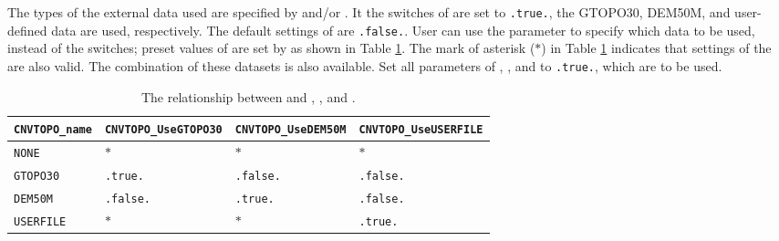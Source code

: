 The types of the external data used are specified by  and/or .
It the switches of  are set to \verb|.true.|, the GTOPO30, DEM50M, and user-defined data are used, respectively.
The default settings of  are \verb|.false.|.
User can use the parameter  to specify which data to be used, instead of the switches;
preset values of  are set by  as shown in Table \ref{tab:cvntopo_name}.
The mark of asterisk ($\ast$) in Table \ref{tab:cvntopo_name} indicates that
settings of the  are also valid.
The combination of these datasets is also available.
Set all parameters of , , and  to \verb|.true.|, which are to be used.

\begin{table}[tbh]
\begin{center}
\caption{The relationship between  and , , and .}
\begin{tabularx}{150mm}{X|l|l|l} \hline
  \rowcolor[gray]{0.9} \verb|CNVTOPO_name| & \verb|CNVTOPO_UseGTOPO30| & \verb|CNVTOPO_UseDEM50M| & \verb|CNVTOPO_UseUSERFILE| \\ \hline
                       \verb|NONE|           & $\ast$         & $\ast$         & $\ast$          \\ \hline
                       \verb|GTOPO30|        & \verb|.true.|  & \verb|.false.| & \verb|.false.|  \\ \hline
                       \verb|DEM50M|         & \verb|.false.| & \verb|.true.|  & \verb|.false.|  \\ \hline
                       \verb|USERFILE|       & $\ast$         & $\ast$         & \verb|.true.|   \\ \hline
\end{tabularx}
\label{tab:cvntopo_name}
\end{center}
\end{table}


